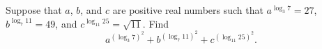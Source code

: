 Suppose that $ a$, $ b$, and $ c$ are positive real numbers such that $ a^{\log_3 7} = 27$, $ b^{\log_7 11} = 49$, and $ c^{\log_{11} 25} = \sqrt {11}$. Find
\[ a^{(\log_3 7)^2} + b^{(\log_7 11)^2} + c^{(\log_{11} 25)^2}.
\]